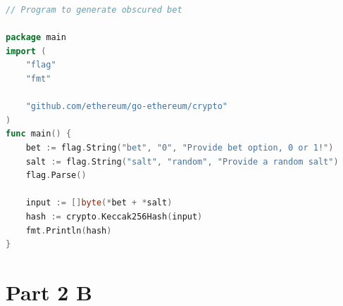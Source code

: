 \documentclass[12pt,a4paper]{article}
\begin{document}
\begin{lstlisting}[language=go]
// Program to generate obscured bet

package main
import (
	"flag"
	"fmt"

	"github.com/ethereum/go-ethereum/crypto"
)
func main() {
	bet := flag.String("bet", "0", "Provide bet option, 0 or 1!")
	salt := flag.String("salt", "random", "Provide a random salt")
	flag.Parse()

	input := []byte(*bet + *salt)
	hash := crypto.Keccak256Hash(input)
	fmt.Println(hash)
}

\end{lstlisting}

\section*{Part 2 B}
\end{document}
